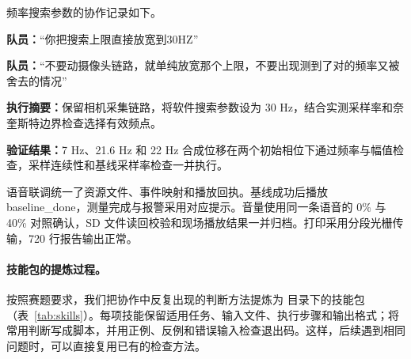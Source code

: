 频率搜索参数的协作记录如下。

\begin{notebox}
\small
\textbf{队员：}“你把搜索上限直接放宽到30HZ”\par
\textbf{队员：}“不要动摄像头链路，就单纯放宽那个上限，不要出现测到了对的频率又被舍去的情况”\par\smallskip
\textbf{执行摘要：}保留相机采集链路，将软件搜索参数设为 30 Hz，结合实测采样率和奈奎斯特边界检查选择有效频点。\par
\textbf{验证结果：}7 Hz、21.6 Hz 和 22 Hz 合成位移在两个初始相位下通过频率与幅值检查，采样连续性和基线采样率检查一并执行。
\end{notebox}

语音联调统一了资源文件、事件映射和播放回执。基线成功后播放 baseline\_done，测量完成与报警采用对应提示。音量使用同一条语音的 0\% 与 40\% 对照确认，SD 文件读回校验和现场播放结果一并归档。打印采用分段光栅传输，720 行报告输出正常。

\paragraph{技能包的提炼过程。}按照赛题要求，我们把协作中反复出现的判断方法提炼为  目录下的技能包（表~\ref{tab:skills}）。每项技能保留适用任务、输入文件、执行步骤和输出格式；将常用判断写成脚本，并用正例、反例和错误输入检查退出码。这样，后续遇到相同问题时，可以直接复用已有的检查方法。

